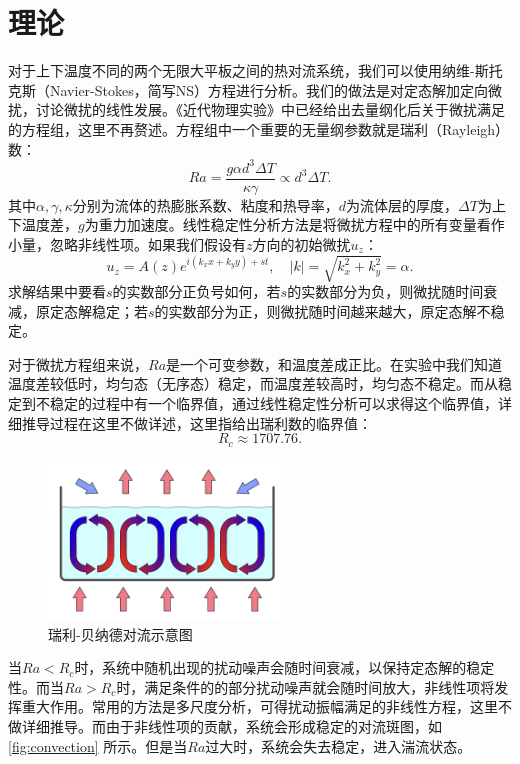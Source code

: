 \documentclass[font=default]{mpltx}
\begin{document}
\section{理论}
对于上下温度不同的两个无限大平板之间的热对流系统，我们可以使用纳维-斯托克斯（Navier-Stokes，简写NS）方程进行分析。我们的做法是对定态解加定向微扰，讨论微扰的线性发展。《近代物理实验》中已经给出去量纲化后关于微扰满足的方程组，这里不再赘述。方程组中一个重要的无量纲参数就是瑞利（Rayleigh）数：
\begin{equation}
    Ra=\frac{g\alpha d^3\Delta T}{\kappa\gamma}\propto d^3\Delta T.
\end{equation}
其中$\alpha,\gamma,\kappa$分别为流体的热膨胀系数、粘度和热导率，$d$为流体层的厚度，$\Delta T$为上下温度差，$g$为重力加速度。线性稳定性分析方法是将微扰方程中的所有变量看作小量，忽略非线性项。如果我们假设有$z$方向的初始微扰$u_z$：
\begin{equation}
    u_z=A(z)e^{i(k_xx+k_yy)+st},\quad |k|=\sqrt{k_x^2+k_y^2}=\alpha.
\end{equation}
求解结果中要看$s$的实数部分正负号如何，若$s$的实数部分为负，则微扰随时间衰减，原定态解稳定；若$s$的实数部分为正，则微扰随时间越来越大，原定态解不稳定。

对于微扰方程组来说，$Ra$是一个可变参数，和温度差成正比。在实验中我们知道温度差较低时，均匀态（无序态）稳定，而温度差较高时，均匀态不稳定。而从稳定到不稳定的过程中有一个临界值，通过线性稳定性分析可以求得这个临界值，详细推导过程在这里不做详述，这里指给出瑞利数的临界值：
\begin{equation}
    R_c\approx 1707.76.
\end{equation}
\begin{figure}
    \centering
    \includegraphics[width=0.55\textwidth]{fig/convection.png}
    \caption{瑞利-贝纳德对流示意图}
    \label{fig:convection}
\end{figure}

当$Ra<R_c$时，系统中随机出现的扰动噪声会随时间衰减，以保持定态解的稳定性。而当$Ra>R_c$时，满足条件的的部分扰动噪声就会随时间放大，非线性项将发挥重大作用。常用的方法是多尺度分析，可得扰动振幅满足的非线性方程，这里不做详细推导。而由于非线性项的贡献，系统会形成稳定的对流斑图，如\autoref{fig:convection} 所示。但是当$Ra$过大时，系统会失去稳定，进入湍流状态。
\end{document}

